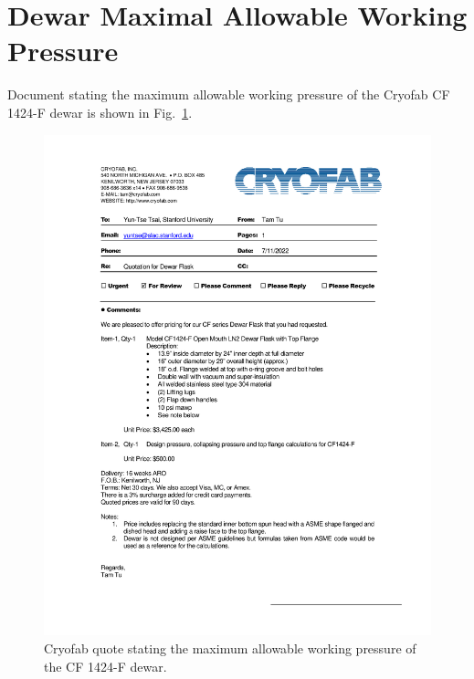 \section{Dewar Maximal Allowable Working Pressure}
\label{app:mawp}

Document stating the maximum allowable working pressure
of the Cryofab CF 1424-F dewar is shown in Fig.~\ref{fig:mawp}.

\begin{figure}[h]
    \centering
    \includegraphics[height=0.73\textheight]{fig/CryofabCF1424FQuote.pdf}
    \caption{Cryofab quote stating the maximum allowable working
    pressure of the CF 1424-F dewar.}
    \label{fig:mawp}
\end{figure}